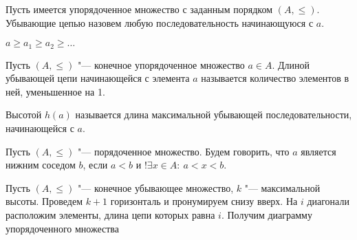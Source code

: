 \begin{definition}
    Пусть имеется упорядоченное множество с заданным порядком $(A , \leq)$. Убывающие
цепью назовем любую последовательность начинающуюся с $a$.

$a \ge a_1 \ge a_2 \ge \dots$
\end{definition}


\begin{definition}
    Пусть $(A, \leq)$ "--- конечное упорядоченное множество $a \in A$. Длиной убывающей 
цепи начинающейся с элемента $a$ называется количество элементов в ней, уменьшенное на 1.
\end{definition}

\begin{definition}
    Высотой $h(a)$ называется длина максимальной убывающей последовательности,
начинающейся с $a$.
\end{definition}

\begin{definition}
    Пусть $(A, \leq)$ "--- порядоченное множество. Будем говорить, что $a$ является
    нижним соседом $b$, если $a < b$ и $!\exists x \in A: ~ a < x < b$.
\end{definition}

\begin{definition}
    Пусть $(A, \leq)$ "--- конечное убывающее множество, $k$ "--- максимальной
    высоты. Проведем $k + 1$ горизонталь и пронумируем снизу вверх. На $i$ диагонали
    расположим элементы, длина цепи которых равна $i$. Получим диаграмму упорядоченного множества
\end{definition}















































    
